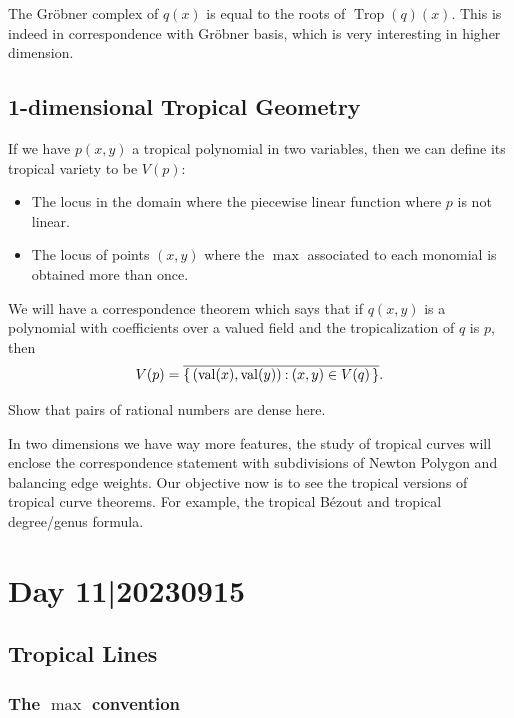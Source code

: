 \documentclass[12pt]{memoir}
\DeclareMathOperator{\val}{val}
\DeclareMathOperator{\Trop}{Trop}
\theoremstyle{definition}
\begin{document}
The Gr\"obner complex of $q(x)$ is equal to the roots of $\Trop(q)(x)$. This is indeed in correspondence with Gr\"obner basis, which is very interesting in higher dimension. 

\subsection{1-dimensional Tropical Geometry}

If we have $p(x,y)$ a tropical polynomial in two variables, then we can define its tropical variety to be $V(p)$:
\begin{itemize}
    \item The locus in the domain where the piecewise linear function where $p$ is not linear.
    \item The locus of points $(x,y)$ where the $\max$ associated to each monomial is obtained more than once.
\end{itemize}

We will have a correspondence theorem which says that if $q(x,y)$ is a polynomial with coefficients over a valued field and the tropicalization of $q$ is $p$, then 
$$V(p)=\ov{\set{(\val(x),\val(y))\: (x,y)\in V(q)}}.$$
\begin{Ej}
Show that pairs of rational numbers are dense here. 
\end{Ej}
In two dimensions we have way more features, the study of tropical curves will enclose the correspondence statement with subdivisions of Newton Polygon and balancing edge weights. Our objective now is to see the tropical versions of tropical curve theorems. For example, the tropical Bézout and tropical degree/genus formula.

\section{Day 11|20230915}




\subsection{Tropical Lines}

\subsubsection{The $\max$ convention}
\end{document}
